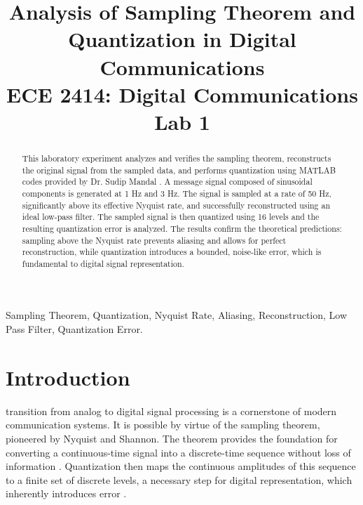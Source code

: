 \documentclass[conference]{IEEEtran}
\begin{document}
\title{Analysis of Sampling Theorem and Quantization in Digital Communications\\
{\large ECE 2414: Digital Communications Lab 1}
}

\author{
}

\maketitle

\begin{abstract}
This laboratory experiment analyzes and verifies the sampling theorem, reconstructs the original signal from the sampled data, and performs quantization using MATLAB codes provided by Dr. Sudip Mandal \cite{mandal2025}.
  A message signal composed of sinusoidal components is generated at 1 Hz and 3 Hz. The signal is sampled at a rate of 50 Hz, significantly above its effective Nyquist rate, and successfully reconstructed using an ideal low-pass filter. The sampled signal is then quantized using 16 levels and the resulting quantization error is analyzed. The results confirm the theoretical predictions: sampling above the Nyquist rate prevents aliasing and allows for perfect reconstruction, while quantization introduces a bounded, noise-like error, which is fundamental to digital signal representation.
\end{abstract}

\begin{IEEEkeywords}
Sampling Theorem, Quantization, Nyquist Rate, Aliasing, Reconstruction, Low Pass Filter, Quantization Error.
\end{IEEEkeywords}

\section{Introduction}
 transition from analog to digital signal processing is a cornerstone of modern communication systems. It is possible by virtue of the sampling theorem, pioneered by Nyquist and Shannon. The theorem provides the foundation for converting a continuous-time signal into a discrete-time sequence without loss of information \cite{proakis2008digital}. Quantization then maps the continuous amplitudes of this sequence to a finite set of discrete levels, a necessary step for digital representation, which inherently introduces error \cite{haykin2009communication}.
\end{document}

